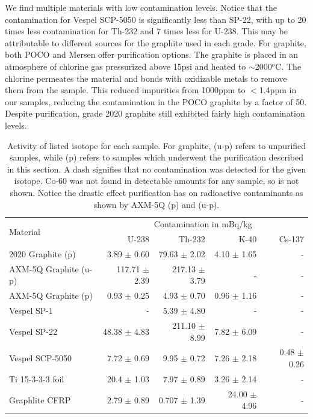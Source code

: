 \documentclass[final]{svjour2}
\begin{document}
We find multiple materials with low contamination levels. Notice that the contamination for Vespel SCP-5050 is significantly less than SP-22, with up to 20 times less contamination for Th-232 and 7 times less for U-238. This may be attributable to different sources for the graphite used in each grade. For graphite, both POCO and Mersen offer purification options. The graphite is placed in an atmosphere of chlorine gas pressurized above 15psi and heated to $\sim$2000$^o$C. The chlorine permeates the material and bonds with oxidizable metals to remove them from the sample. This reduced impurities from 1000ppm to $<$1.4ppm in our samples, reducing the contamination in the POCO graphite by a factor of 50. Despite purification, grade 2020 graphite still exhibited fairly high contamination levels.

\begin{table}[htb]
\centering
\begin{threeparttable}
\begin{tabular}{lrrrr}
\toprule
\multirow{2}{*}{\Large{Material}} & \multicolumn{4}{c}{\large{Contamination in mBq/kg}}\\
& U-238 & Th-232 & K-40 & Cs-137 \\\toprule
2020 Graphite (p) & 3.89 $\pm$ 0.60 & 79.63 $\pm$ 2.02 & 4.10 $\pm$ 1.65 &- \\
AXM-5Q Graphite (u-p) & 117.71 $\pm$ 2.39 & 217.13 $\pm$ 3.79 & -&-  \\
AXM-5Q Graphite (p) & 0.93 $\pm$ 0.25 & 4.93 $\pm$ 0.70 & 0.96 $\pm$ 1.16 & - \\
Vespel SP-1 & -& 5.39 $\pm$ 4.80 & -&-  \\
Vespel SP-22 & 48.38 $\pm$ 4.83 & 211.10 $\pm$ 8.99 & 7.82 $\pm$ 6.09 & -\\
Vespel SCP-5050 & 7.72 $\pm$ 0.69 & 9.95 $\pm$ 0.72 & 7.26 $\pm$ 2.18 & 0.48 $\pm$ 0.26 \\
Ti 15-3-3-3 foil & 20.4 $\pm$ 1.03 & 7.97 $\pm$ 0.89 &  3.26 $\pm$ 2.14 & - \\
Graphlite CFRP & 2.79 $\pm$ 0.89 & 0.707 $\pm$ 1.39 & 24.00 $\pm$ 4.96 & -\\
\bottomrule
\end{tabular}
 \caption{{\small Activity of listed isotope for each sample. For graphite, (u-p) refers to unpurified samples, while (p) refers to samples which underwent the purification described in this section. A dash signifies that no contamination was detected for the given isotope. Co-60 was not found in detectable amounts for any sample, so is not shown. Notice the drastic effect purification has on radioactive contaminants as shown by AXM-5Q (p) and (u-p). }}
\label{radioactivity}
\end{threeparttable}
\end{table}
\end{document}
